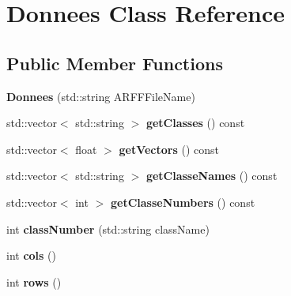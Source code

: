 \hypertarget{class_donnees}{
\section{Donnees Class Reference}
\label{class_donnees}
}
\subsection*{Public Member Functions}
\begin{DoxyCompactItemize}
\item 
\hypertarget{class_donnees_a781602d5707d7144dcd1144c2c578a89}{
{\bfseries Donnees} (std::string ARFFFileName)}
\label{class_donnees_a781602d5707d7144dcd1144c2c578a89}

\item 
\hypertarget{class_donnees_aec188e1c290a6bb53b74e233ce2c0244}{
std::vector$<$ std::string $>$ {\bfseries getClasses} () const }
\label{class_donnees_aec188e1c290a6bb53b74e233ce2c0244}

\item 
\hypertarget{class_donnees_a2185c4a76ab01b6c011ea10c4b4d7c0c}{
std::vector$<$ float $>$ {\bfseries getVectors} () const }
\label{class_donnees_a2185c4a76ab01b6c011ea10c4b4d7c0c}

\item 
\hypertarget{class_donnees_abf624fad76ba88849622f169ed11c6e4}{
std::vector$<$ std::string $>$ {\bfseries getClasseNames} () const }
\label{class_donnees_abf624fad76ba88849622f169ed11c6e4}

\item 
\hypertarget{class_donnees_abaac8a42d10da2645b886b8b598c509d}{
std::vector$<$ int $>$ {\bfseries getClasseNumbers} () const }
\label{class_donnees_abaac8a42d10da2645b886b8b598c509d}

\item 
\hypertarget{class_donnees_a3ed83247f281a9607d4abecc1eac28ba}{
int {\bfseries classNumber} (std::string className)}
\label{class_donnees_a3ed83247f281a9607d4abecc1eac28ba}

\item 
\hypertarget{class_donnees_a47fa32b9be07e4fbe939deef00af5dd4}{
int {\bfseries cols} ()}
\label{class_donnees_a47fa32b9be07e4fbe939deef00af5dd4}

\item 
\hypertarget{class_donnees_ab842ed7844040f71de51057382e797b2}{
int {\bfseries rows} ()}
\label{class_donnees_ab842ed7844040f71de51057382e797b2}


\end{DoxyCompactItemize}
